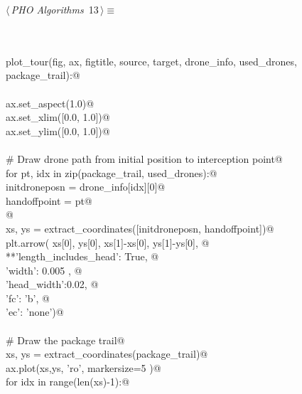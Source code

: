 \documentclass[10.0pt]{report}
\begin{document}
\begin{flushleft} \small\label{scrap6}\raggedright\small
{} $\langle\,${\itshape PHO Algorithms}\nobreak\ {\footnotesize {13}}$\,\rangle\equiv$
\vspace{-1ex}
\begin{list}{}{} \item
\mbox{}\verb@@\\
\mbox{}\verb@@\\
\mbox{}\verb@def plot_tour(fig, ax, figtitle, source, target, drone_info, used_drones, package_trail):@\\
\mbox{}\verb@@\\
\mbox{}\verb@    ax.set_aspect(1.0)@\\
\mbox{}\verb@    ax.set_xlim([0.0, 1.0])@\\
\mbox{}\verb@    ax.set_ylim([0.0, 1.0])@\\
\mbox{}\verb@@\\
\mbox{}\verb@    # Draw drone path from initial position to interception point@\\
\mbox{}\verb@    for pt, idx in zip(package_trail, used_drones):@\\
\mbox{}\verb@         initdroneposn = drone_info[idx][0]@\\
\mbox{}\verb@         handoffpoint  = pt@\\
\mbox{}\verb@    @\\
\mbox{}\verb@         xs, ys = extract_coordinates([initdroneposn, handoffpoint])@\\
\mbox{}\verb@         plt.arrow( xs[0], ys[0], xs[1]-xs[0], ys[1]-ys[0], @\\
\mbox{}\verb@                    **{'length_includes_head': True, @\\
\mbox{}\verb@                       'width': 0.005 , @\\
\mbox{}\verb@                       'head_width':0.02, @\\
\mbox{}\verb@                       'fc': 'b', @\\
\mbox{}\verb@                       'ec': 'none'})@\\
\mbox{}\verb@@\\
\mbox{}\verb@    # Draw the package trail@\\
\mbox{}\verb@    xs, ys = extract_coordinates(package_trail)@\\
\mbox{}\verb@    ax.plot(xs,ys, 'ro', markersize=5 )@\\
\mbox{}\verb@    for idx in range(len(xs)-1):@\\

\end{list}
\end{flushleft}
\end{document}
